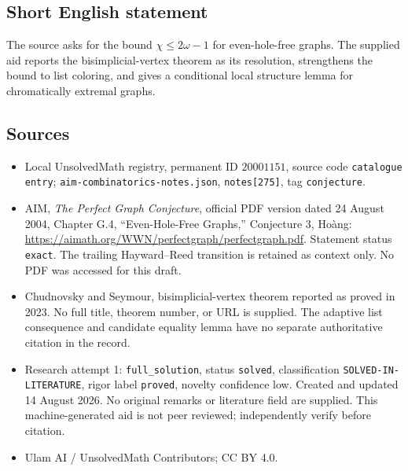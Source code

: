 \documentclass[11pt]{article}
\begin{document}
\subsection{Short English statement}
The source asks for the bound \(\chi\le2\omega-1\) for even-hole-free graphs. The supplied aid reports the bisimplicial-vertex theorem as its resolution, strengthens the bound to list coloring, and gives a conditional local structure lemma for chromatically extremal graphs.
\subsection{Sources}
\begin{itemize}
\item Local UnsolvedMath registry, permanent ID \(20001151\), source code \texttt{catalogue entry}; \texttt{aim-combinatorics-notes.json}, \texttt{notes[275]}, tag \texttt{conjecture}.
\item AIM, \emph{The Perfect Graph Conjecture}, official PDF version dated 24 August 2004, Chapter G.4, ``Even-Hole-Free Graphs,'' Conjecture 3, Ho\`ang: \url{https://aimath.org/WWN/perfectgraph/perfectgraph.pdf}. Statement status \texttt{exact}. The trailing Hayward--Reed transition is retained as context only. No PDF was accessed for this draft.
\item Chudnovsky and Seymour, bisimplicial-vertex theorem reported as proved in 2023. No full title, theorem number, or URL is supplied. The adaptive list consequence and candidate equality lemma have no separate authoritative citation in the record.
\item Research attempt 1: \texttt{full\_solution}, status \texttt{solved}, classification \texttt{SOLVED-IN-LITERATURE}, rigor label \texttt{proved}, novelty confidence low. Created and updated 14 August 2026. No original remarks or literature field are supplied. This machine-generated aid is not peer reviewed; independently verify before citation.
\item Ulam AI / UnsolvedMath Contributors; CC BY 4.0.
\end{itemize}
\end{document}
